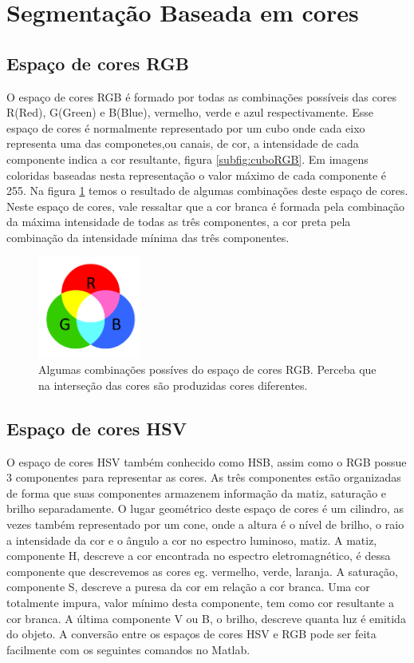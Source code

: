 \documentclass[
	article,			%
	11pt,				%
	oneside,			%
	a4paper,			%
	english,			%
	brazil,				%
	sumario=tradicional
	]{abntex2}
\begin{document}
\section{Segmentação Baseada em cores}

\subsection{Espaço de cores RGB}
O espaço de cores RGB é formado por todas as combinações possíveis das cores
R(Red), G(Green) e B(Blue), vermelho, verde e azul respectivamente. Esse espaço
de cores é normalmente representado por um cubo onde cada eixo representa uma
das componetes,ou canais, de cor, a intensidade de cada componente
indica a cor resultante, figura \ref{subfig:cuboRGB}.
Em imagens coloridas baseadas nesta representação o valor máximo de cada
componente é 255. Na figura \ref{fig:rgbComb} temos o resultado de algumas
combinações deste espaço de cores. Neste espaço de cores, vale ressaltar que a
cor branca é formada pela combinação da máxima intensidade de todas as três componentes, a cor preta
pela combinação da intensidade mínima das três componentes.


\begin{figure} 
		\centering
		\includegraphics[width=0.3\textwidth,scale=1]{imagens/ex4/RGB_combinacao.png}
        \caption{Algumas combinações possíves do espaço de cores RGB. Perceba
        que na interseção das cores são produzidas cores diferentes.}
        \label{fig:rgbComb}
\end{figure}
        
        
\subsection{Espaço de cores HSV} 
O espaço de cores HSV também conhecido como HSB, assim como o RGB possue 3
componentes para representar as cores. As três componentes estão organizadas de forma que suas componentes
armazenem informação da matiz, saturação e brilho separadamente. O lugar
geométrico deste espaço de cores é um cilindro, as vezes também representado por
um cone, onde a altura é o nível de brilho, o raio a intensidade da cor e o
ângulo a cor no espectro luminoso, matiz.
A matiz, componente H, descreve a cor encontrada no espectro eletromagnético, é
dessa componente que descrevemos as cores eg. vermelho, verde, laranja. A
saturação, componente S, descreve a puresa da cor em relação a cor branca. Uma
cor totalmente impura, valor mínimo desta componente, tem como cor resultante a cor branca.
A última componente V ou B, o brilho, descreve quanta luz é emitida do objeto.
A conversão entre os espaços de cores HSV e RGB pode ser feita facilmente com os
seguintes comandos no Matlab. 
\end{document}
